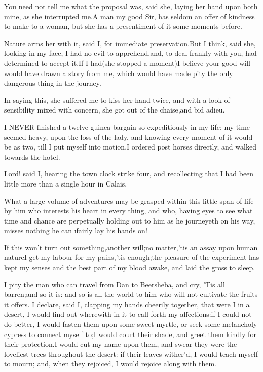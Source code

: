 \documentclass[twoside]{article}
\begin{document}
\tsk You need not tell me what the proposal was, said she, laying her hand
upon both mine, as she interrupted me.\tsk A man my good Sir, has seldom an
offer of kindness to make to a woman, but she has a presentiment of it
some moments before.\tsk 

Nature arms her with it, said I, for immediate preservation.\tsk But I think,
said she, looking in my face, I had no evil to apprehend,\tsk and, to deal
frankly with you, had determined to accept it.\tsk If I had\tsk (she stopped a
moment)\tsk I believe your good will would have drawn a story from me, which
would have made pity the only dangerous thing in the journey.

In saying this, she suffered me to kiss her hand twice, and with a look
of sensibility mixed with concern, she got out of the chaise,\tsk and bid
adieu.






I NEVER finished a twelve guinea bargain so expeditiously in my life: my
time seemed heavy, upon the loss of the lady, and knowing every moment of
it would be as two, till I put myself into motion,\tsk I ordered post horses
directly, and walked towards the hotel.

Lord! said I, hearing the town clock strike four, and recollecting that I
had been little more than a single hour in Calais,\tsk 

\tsk What a large volume of adventures may be grasped within this little span
of life by him who interests his heart in every thing, and who, having
eyes to see what time and chance are perpetually holding out to him as he
journeyeth on his way, misses nothing he can \i{fairly} lay his hands on!

\tsk If this won’t turn out something,\tsk another will;\tsk no matter,\tsk ’tis an assay
upon human nature\tsk I get my labour for my pains,\tsk ’tis enough;\tsk the pleasure
of the experiment has kept my senses and the best part of my blood awake,
and laid the gross to sleep.

I pity the man who can travel from Dan to Beersheba, and cry, ’Tis all
barren;\tsk and so it is: and so is all the world to him who will not
cultivate the fruits it offers.  I declare, said I, clapping my hands
cheerily together, that were I in a desert, I would find out wherewith in
it to call forth my affections:\tsk if I could not do better, I would fasten
them upon some sweet myrtle, or seek some melancholy cypress to connect
myself to;\tsk I would court their shade, and greet them kindly for their
protection.\tsk I would cut my name upon them, and swear they were the
loveliest trees throughout the desert: if their leaves wither’d, I would
teach myself to mourn; and, when they rejoiced, I would rejoice along
with them.
\end{document}
